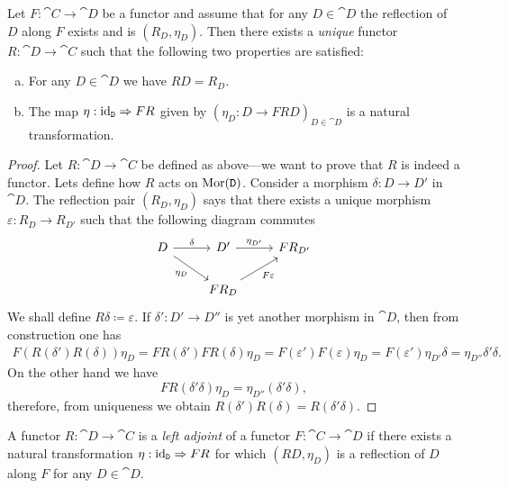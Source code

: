 \begin{proposition}
    \label{prop:reflection-as-func-and-unit-as-nat-tranf}
    Let \(F: \cat C \to \cat D\) be a functor and assume that for any \(D \in \cat D\)
    the reflection of \(D\) along \(F\) exists and is \((R_D, \eta_D)\). Then there
    exists a \emph{unique} functor \(R: \cat D \to \cat C\) such that the following
    two properties are satisfied:
    \begin{enumerate}[(a)]\setlength\itemsep{0em}
        \item For any \(D \in \cat D\) we have \(R D = R_D\).

        \item The map \(\eta: \operatorname{id}_{\texttt D} \Rightarrow F R\) given by
              \((\eta_D: D \to F R D)_{D \in \cat D}\) is a natural transformation.
    \end{enumerate}
\end{proposition}

\begin{proof}
    Let \(R: \cat D \to \cat C\) be defined as above---we want to prove that \(R\) is
    indeed a functor. Lets define how \(R\) acts on \(\operatorname{Mor}(\texttt D)\). Consider a
    morphism \(\delta: D \to D'\) in \(\cat D\). The reflection pair
    \((R_D, \eta_D)\) says that there exists a unique morphism
    \(\varepsilon: R_D \to R_{D'}\) such that the following diagram commutes
    \[
        \begin{tikzcd}
            D \ar[r, "\delta"] \ar[rd, "\eta_D"']
            &D' \ar[r, "\eta_{D'}"]
            &F R_{D'}
            \\
            & F R_D \ar[ru, "F \varepsilon"']
            &
        \end{tikzcd}
    \]
    We shall define \(R \delta \coloneq \varepsilon\). If \(\delta': D' \to D''\) is yet another morphism in
    \(\cat D\), then from construction one has
    \begin{align*}
        F(R(\delta') R(\delta)) \eta_D
        = F R(\delta') F R(\delta) \eta_D
        = F(\varepsilon') F(\varepsilon) \eta_D
        = F(\varepsilon') \eta_{D'} \delta
        = \eta_{D''} \delta' \delta.
    \end{align*}
    On the other hand we have
    \[
        F R(\delta' \delta) \eta_D = \eta_{D''} (\delta' \delta),
    \]
    therefore, from uniqueness we obtain \(R(\delta') R(\delta) = R(\delta' \delta)\).
\end{proof}

\begin{definition}
    \label{def:left-adjoint}
    A functor \(R: \cat D \to \cat C\) is a \emph{left adjoint} of a functor
    \(F: \cat C \to \cat D\) if there exists a natural transformation
    \(\eta: \operatorname{id}_{\texttt D} \Rightarrow F R\) for which \((R D, \eta_D)\) is a reflection of
    \(D\) along \(F\) for any \(D \in \cat D\).
\end{definition}

